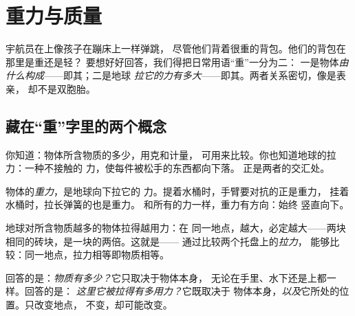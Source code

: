 \chapter{重力与质量}\label{ch:g4:weight-and-mass}

宇航员在上像孩子在蹦床上一样弹跳，
尽管他们背着很重的背包。他们的背包在那里是重还是轻？
要想好好回答，我们得把日常用语“重”一分为二：
一是物体\emph{由什么构成}——即其；二是地球
\emph{拉它的力有多大}——即其。两者关系密切，像是表亲，
却不是双胞胎。

\section{藏在“重”字里的两个概念}

你知道：物体所含物质的多少，用克和计量，
可用来比较。你也知道地球的拉力：一种不接触的
力，使每件被松手的东西都向下落。
正是两者的交汇处。

\begin{definition}[重力]\label{def:g4:weight-and-mass:weight}
物体的\emph{重力}，是地球向下拉它的
力。提着水桶时，手臂要对抗的正是重力，
挂着水桶时，拉长弹簧的也是重力。
和所有的力一样，重力有方向：始终
竖直向下。
\end{definition}

\begin{proposition}\label{prop:g4:weight-and-mass:morestuff}
地球对所含物质越多的物体拉得越用力：在
同一地点，越大，必定越大——两块
相同的砖块，是一块的两倍。这就是——
通过比较两个托盘上的\emph{拉力}，
能够比较\emph{}：同一地点，拉力相等即物质相等。
\end{proposition}

\begin{example}[表亲而非双胞胎]\label{ex:g4:weight-and-mass:cousins}
回答的是：\emph{物质有多少？}它只取决于物体本身，
无论在手里、水下还是上都一样。回答的是：
\emph{这里它被拉得有多用力？}它既取决于
物体本身，\emph{以及}它所处的位置。只改变地点，
不变，却可能改变。
\end{example}

